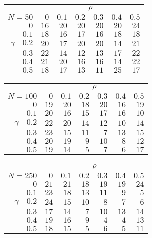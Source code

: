 \begin{tabular}{r|rrrrrr}
\hline\hline
 &\multicolumn{6}{c}{$\rho$} \\ 
 $N = 50$ & $0$ & $0.1$ & $0.2$ & $0.3$ & $0.4$ & $0.5$ \\ 
 \hline$0$ & $16$ & $20$ & $20$ & $20$ & $20$ & $24$\\ 
$0.1$ & $18$ & $16$ & $17$ & $16$ & $18$ & $18$\\ 
$\gamma\quad$$0.2$ & $20$ & $17$ & $20$ & $20$ & $14$ & $21$\\ 
$0.3$ & $22$ & $14$ & $12$ & $13$ & $17$ & $22$\\ 
$0.4$ & $21$ & $20$ & $16$ & $16$ & $14$ & $22$\\ 
$0.5$ & $18$ & $17$ & $13$ & $11$ & $25$ & $17$\\ 
 \hline 
 \end{tabular}
 
 \vspace{2em} 
 
\begin{tabular}{r|rrrrrr}
\hline\hline
 &\multicolumn{6}{c}{$\rho$} \\ 
 $N = 100$ & $0$ & $0.1$ & $0.2$ & $0.3$ & $0.4$ & $0.5$ \\ 
 \hline$0$ & $19$ & $20$ & $18$ & $20$ & $16$ & $19$\\ 
$0.1$ & $20$ & $16$ & $15$ & $17$ & $16$ & $10$\\ 
$\gamma\quad$$0.2$ & $22$ & $20$ & $14$ & $12$ & $10$ & $14$\\ 
$0.3$ & $23$ & $15$ & $11$ & $7$ & $13$ & $15$\\ 
$0.4$ & $20$ & $19$ & $9$ & $10$ & $8$ & $12$\\ 
$0.5$ & $19$ & $14$ & $5$ & $7$ & $6$ & $17$\\ 
 \hline 
 \end{tabular}
 
 \vspace{2em} 
 
\begin{tabular}{r|rrrrrr}
\hline\hline
 &\multicolumn{6}{c}{$\rho$} \\ 
 $N = 250$ & $0$ & $0.1$ & $0.2$ & $0.3$ & $0.4$ & $0.5$ \\ 
 \hline$0$ & $21$ & $21$ & $18$ & $19$ & $19$ & $24$\\ 
$0.1$ & $23$ & $18$ & $13$ & $11$ & $9$ & $5$\\ 
$\gamma\quad$$0.2$ & $24$ & $15$ & $10$ & $8$ & $7$ & $6$\\ 
$0.3$ & $17$ & $14$ & $7$ & $10$ & $13$ & $14$\\ 
$0.4$ & $19$ & $16$ & $9$ & $4$ & $4$ & $13$\\ 
$0.5$ & $18$ & $15$ & $5$ & $6$ & $5$ & $11$\\ 
 \hline 
 \end{tabular}